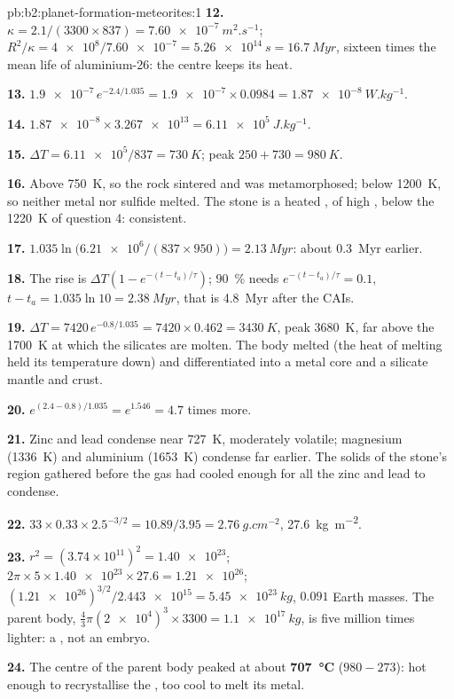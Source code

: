 \begin{solution}{pb:b2:planet-formation-meteorites:1}
\textbf{12.} $\kappa = 2.1/(3300\times837) = \qty{7.60e-7}{m^2.s^{-1}}$;
$R^2/\kappa = \num{4e8}/\num{7.60e-7} = \qty{5.26e14}{s} = \qty{16.7}{Myr}$, sixteen
times the mean life of aluminium-26: the centre keeps its heat.

\textbf{13.} $\num{1.9e-7}\,e^{-2.4/1.035} = \num{1.9e-7}\times0.0984 =
\qty{1.87e-8}{W.kg^{-1}}$.

\textbf{14.} $\num{1.87e-8}\times\num{3.267e13} = \qty{6.11e5}{J.kg^{-1}}$.

\textbf{15.} $\Delta T = \num{6.11e5}/837 = \qty{730}{K}$; peak
$250 + 730 = \qty{980}{K}$.

\textbf{16.} Above \qty{750}{K}, so the rock sintered and was metamorphosed; below
\qty{1200}{K}, so neither metal nor sulfide melted. The stone is a heated ,
of high , below the \qty{1220}{K} of question 4: consistent.

\textbf{17.} $1.035\ln\bigl(\num{6.21e6}/(837\times950)\bigr) = \qty{2.13}{Myr}$:
about \qty{0.3}{Myr} earlier.

\textbf{18.} The rise is $\Delta T(1 - e^{-(t - t_a)/\tau})$; \qty{90}{\percent}
needs $e^{-(t - t_a)/\tau} = 0.1$, $t - t_a = 1.035\ln10 = \qty{2.38}{Myr}$, that is
\qty{4.8}{Myr} after the CAIs.

\textbf{19.} $\Delta T = 7420\,e^{-0.8/1.035} = 7420\times0.462 = \qty{3430}{K}$,
peak \qty{3680}{K}, far above the \qty{1700}{K} at which the silicates are molten.
The body melted (the heat of melting held its temperature down) and
differentiated into a metal core and a silicate mantle and crust.

\textbf{20.} $e^{(2.4 - 0.8)/1.035} = e^{1.546} = 4.7$ times more.

\textbf{21.} Zinc and lead condense near \qty{727}{K}, moderately volatile; magnesium
(\qty{1336}{K}) and aluminium (\qty{1653}{K}) condense far earlier. The solids of
the stone's region gathered before the gas had cooled enough for all the zinc and
lead to condense.

\textbf{22.} $33\times0.33\times2.5^{-3/2} = 10.89/3.95 = \qty{2.76}{g.cm^{-2}}$,
\qty{27.6}{kg.m^{-2}}.

\textbf{23.} $r^2 = (3.74\times10^{11})^2 = \num{1.40e23}$;
$2\pi\times5\times\num{1.40e23}\times27.6 = \num{1.21e26}$;
$(\num{1.21e26})^{3/2}/\num{2.443e15} = \qty{5.45e23}{kg}$, $0.091$ Earth masses.
The parent body, $\tfrac43\pi(\num{2e4})^3\times3300 = \qty{1.1e17}{kg}$, is five
million times lighter: a , not an embryo.

\textbf{24.} The centre of the parent body peaked at about
\textbf{\qty[text-series-to-math=true]{707}{\degreeCelsius}} ($980 - 273$): hot enough to
recrystallise the , too cool to melt its metal.
\end{solution}
